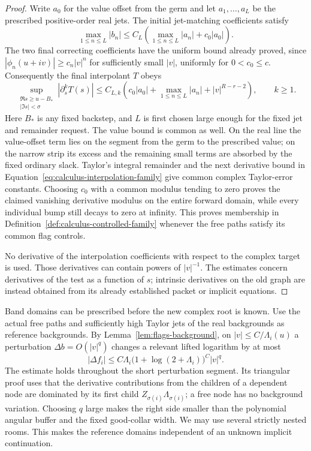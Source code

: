 \begin{proof}
Write $a_0$ for the value offset from the germ and let
$a_1,\ldots,a_L$ be the prescribed positive-order real jets.  The initial
jet-matching coefficients satisfy
\[
 \max_{1\le n\le L}|b_n|
 \le C_L\left(\max_{1\le n\le L}|a_n|+c_0|a_0|\right).
\]
The two final correcting coefficients have the uniform bound already
proved, since $|\phi_n(u+iv)|\ge c_n|v|^n$ for sufficiently small $|v|$,
uniformly for $0<c_0\le c$.  Consequently the final interpolant $T$ obeys
\begin{equation}
 \sup_{\substack{\Re s\ge u-B_*\\|\Im s|<\sigma}}
       |\partial_s^kT(s)|
 \le C_{L,k}\left(c_0|a_0|
        +\max_{1\le n\le L}|a_n|
        +|v|^{R-r-2}\right),\qquad k\ge1.
 \label{eq:calculus-interpolation-family}
\end{equation}
Here $B_*$ is any fixed backstep, and $L$ is first chosen large enough
for the fixed jet and remainder request.  The value bound is common as
well.  On the real line the value-offset term lies on the segment from
the germ to the prescribed value; on the narrow strip its excess and
the remaining small terms are absorbed by the fixed ordinary slack.
Taylor's integral remainder and the next derivative bound in
Equation~\eqref{eq:calculus-interpolation-family} give common complex
Taylor-error constants.  Choosing $c_0$ with a common modulus tending to
zero proves the claimed vanishing derivative modulus on the entire forward
domain, while every individual bump still decays to zero at infinity.
This proves membership in Definition~\ref{def:calculus-controlled-family}
whenever the free paths satisfy its common flag controls.

No derivative of the interpolation coefficients with respect to the
complex target is used.  Those derivatives can contain powers of
$|v|^{-1}$.  The estimates concern derivatives of the test as a function
of $s$; intrinsic derivatives on the old graph are instead obtained from
its already established packet or implicit equations.
\end{proof}

Band domains can be prescribed before the new complex root is known.
Use the actual free paths and sufficiently high Taylor jets of the real
backgrounds as reference backgrounds.  By
Lemma~\ref{lem:flags-background}, on $|v|\le C/\Lambda_i(u)$ a perturbation
$\Delta b=O(|v|^q)$ changes a relevant lifted logarithm by at most
\begin{equation}
 |\Delta f_i|
 \le C\Lambda_i\bigl(1+\log(2+\Lambda_i)\bigr)^C |v|^q.
 \label{eq:calculus-angle-stability}
\end{equation}
The estimate holds throughout the short perturbation segment.  Its
triangular proof uses that the derivative contributions from the children
of a dependent node are dominated by its first child
$Z_{\sigma(i)}\Lambda_{\sigma(i)}$; a free node has no background
variation.  Choosing $q$ large makes the right side smaller than the
polynomial angular buffer and the fixed good-collar width.  We may use
several strictly nested rooms.  This makes the reference domains
independent of an unknown implicit continuation.

